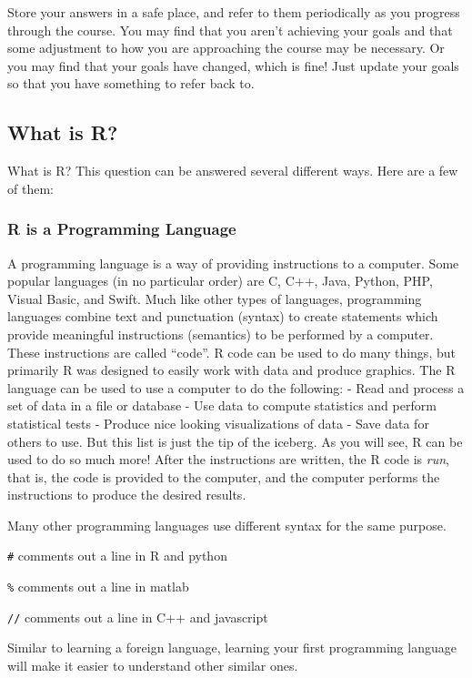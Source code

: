 \documentclass[
]{article}
\newenvironment{bonus}{
  \specialblock{bonus}{sun-fill.png}{Bonus}
}{\endspecialblock}
\begin{document}
Store your answers in a safe place, and refer to them periodically as you progress through the course.
You may find that you aren't achieving your goals and that some adjustment to how you are approaching the course may be necessary.
Or you may find that your goals have changed, which is fine!
Just update your goals so that you have something to refer back to.

\hypertarget{what-is-r}{%
\subsection{What is R?}\label{what-is-r}}

What is R? This question can be answered several different ways.
Here are a few of them:

\hypertarget{r-is-a-programming-language}{%
\subsubsection{R is a Programming Language}\label{r-is-a-programming-language}}

A programming language is a way of providing instructions to a computer.
Some popular languages (in no particular order) are C, C++, Java, Python, PHP, Visual Basic, and Swift.
Much like other types of languages, programming languages combine text and punctuation (syntax) to create statements which provide meaningful instructions (semantics) to be performed by a computer.
These instructions are called ``code''.
R code can be used to do many things, but primarily R was designed to easily work with data and produce graphics.
The R language can be used to use a computer to do the following:
- Read and process a set of data in a file or database
- Use data to compute statistics and perform statistical tests
- Produce nice looking visualizations of data
- Save data for others to use.
But this list is just the tip of the iceberg.
As you will see, R can be used to do so much more!
After the instructions are written, the R code is \emph{run}, that is, the code is provided to the computer, and the computer performs the instructions to produce the desired results.

\begin{bonus}
Many other programming languages use different syntax for the same
purpose.

\texttt{\#} comments out a line in R and python

\texttt{\%} comments out a line in matlab

\texttt{//} comments out a line in C++ and javascript

Similar to learning a foreign language, learning your first programming
language will make it easier to understand other similar ones.
\end{bonus}
\end{document}
